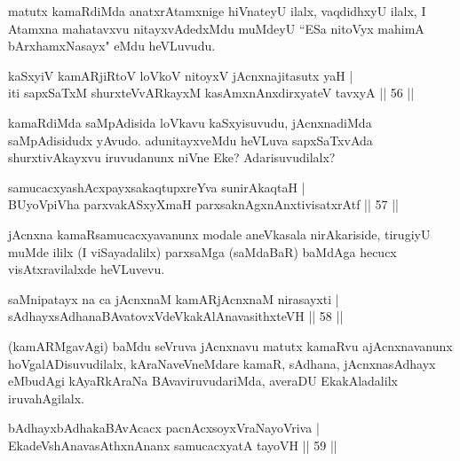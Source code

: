 \begin{artha}
matutx kamaRdiMda anatxrAtamxnige hiVnateyU ilalx, vaqdidhxyU ilalx, I Atamxna mahatavxvu nitayxvAdedxMdu muMdeyU ``ESa nitoVyx mahimA bArxhamxNasayx" eMdu heVLuvudu.
\end{artha}


\begin{shl}
kaSxyiV kamARjiRtoV loVkoV nitoyxV jAcnxnajitasutx yaH |\\
iti sapxSaTxM shurxteVvARkayxM kasAmxnAnx\s \s dirxyateV tavxyA \hfill || 56 ||
\end{shl}

\begin{artha}
kamaRdiMda saMpAdisida loVkavu kaSxyisuvudu, jAcnxnadiMda saMpAdisidudx yAvudo. 
adunitayxveMdu heVLuva sapxSaTxvAda shurxtivAkayxvu iruvudanunx niVne Eke? Adarisuvudilalx?
\end{artha}

\begin{shl}
samucacxyashAcxpayxsakaqtupxreYva sunirAkaqtaH |\\
BUyoV\s piVha parxvakASxyXmaH parxsaknAgxnAnxtivisatxrAtf \hfill || 57 ||
\end{shl}

\begin{artha}
jAcnxna kamaRsamucacxyavanunx  modale aneVkasala nirAkariside, tirugiyU muMde ililx (I viSayadalilx) parxsaMga (saMdaBaR) baMdAga hecucx visAtxravilalxde heVLuvevu.
\end{artha}


\begin{shl}
saMnipatayx na ca jAcnxnaM kamARjAcnxnaM nirasayxti |\\
sAdhayxsAdhanaBAvatovxVdeVkakAlAnavasithxteVH \hfill || 58 ||
\end{shl}

\begin{artha} 
(kamARMgavAgi) baMdu seVruva jAcnxnavu matutx kamaRvu ajAcnxnavanunx hoVgalADisuvudilalx, kAraNaveVneMdare kamaR, sAdhana, jAcnxnasAdhayx eMbudAgi kAyaRkAraNa BAvaviruvudariMda, averaDU EkakAladalilx iruvahAgilalx.
\end{artha}


\begin{shl}
bAdhayxbAdhakaBAvAcacx pacnAcxsoyxVraNayoVriva |\\
EkadeVshAnavasAthxnAnanx samucacxyatA tayoVH \hfill || 59 ||
\end{shl}

